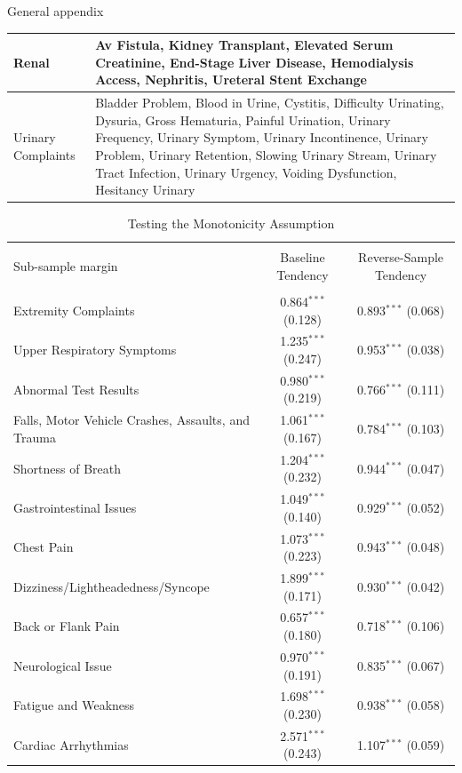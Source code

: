 \documentclass[,,nonblindrev]{informs}
\begin{document}
\begin{APPENDIX}{General appendix}
\begin{longtable}{|p{5cm}|p{12cm}|}
\hline
Renal & Av Fistula, Kidney Transplant, Elevated Serum Creatinine, End-Stage Liver Disease, Hemodialysis Access, Nephritis, Ureteral Stent Exchange \\
\hline
Urinary Complaints & Bladder Problem, Blood in Urine, Cystitis, Difficulty Urinating, Dysuria, Gross Hematuria, Painful Urination, Urinary Frequency, Urinary Symptom, Urinary Incontinence, Urinary Problem, Urinary Retention, Slowing Urinary Stream, Urinary Tract Infection, Urinary Urgency, Voiding Dysfunction, Hesitancy Urinary \\
\hline
\end{longtable}

\newpage

\begin{table}[!htbp]
\centering 
  \caption{Testing the Monotonicity Assumption} 
\label{tab:monotonicity}
\begin{tabular}{@{\extracolsep{5.5pt}}lcc} 
\\[-1.8ex]\hline 
\hline \\[-1.8ex] 
Sub-sample margin & Baseline Tendency  & Reverse-Sample Tendency \\ 
\hline \\[-1.8ex] 
Extremity Complaints & 0.864$^{***}$ (0.128) & 0.893$^{***}$ (0.068) \\ 
Upper Respiratory Symptoms & 1.235$^{***}$ (0.247) & 0.953$^{***}$ (0.038) \\ 
Abnormal Test Results & 0.980$^{***}$ (0.219) & 0.766$^{***}$ (0.111) \\
Falls, Motor Vehicle Crashes, Assaults, and Trauma & 1.061$^{***}$ (0.167) & 0.784$^{***}$ (0.103) \\
Shortness of Breath & 1.204$^{***}$ (0.232) & 0.944$^{***}$ (0.047) \\
Gastrointestinal Issues & 1.049$^{***}$ (0.140) & 0.929$^{***}$ (0.052) \\
Chest Pain & 1.073$^{***}$ (0.223) & 0.943$^{***}$ (0.048) \\
Dizziness/Lightheadedness/Syncope & 1.899$^{***}$ (0.171) & 0.930$^{***}$ (0.042) \\
Back or Flank Pain & 0.657$^{***}$ (0.180) & 0.718$^{***}$ (0.106) \\
Neurological Issue & 0.970$^{***}$ (0.191) & 0.835$^{***}$ (0.067) \\
Fatigue and Weakness & 1.698$^{***}$ (0.230) & 0.938$^{***}$ (0.058) \\
Cardiac Arrhythmias & 2.571$^{***}$ (0.243) & 1.107$^{***}$ (0.059) \\

\end{tabular}
\end{table}
\end{APPENDIX}
\end{document}

